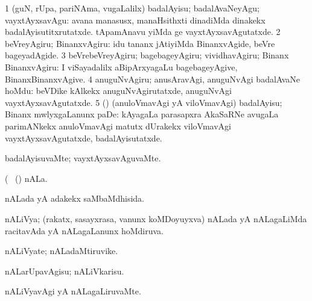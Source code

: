 \noindent
\gl{\akirx}
\expl{}
\bmng
\bnum
\num{1} (guN, rUpa, pariNAma, \mo vugaLalilx) badalAyisu; badalAvaNeyAgu; vayxtAyxsavAgu:  avana manasusx, manaHsithxti dinadiMda dinakekx badalAyisutitxrutatxde.     tApamAnavu  yiMda  ge vayxtAyxsavAgutatxde. 
\num{2} beVreyAgiru; BinanxvAgiru:  idu tananx jAtiyiMda BinanxvAgide, beVre bageyadAgide. 
\num{3} beVrebeVreyAgiru; bagebageyAgiru; vividhavAgiru; Binanx BinanxvAgiru:  I viSayadalilx aBipArxyagaLu bagebageyAgive, BinanxBinanxvAgive. 
\num{4} anuguNvAgiru; anusAravAgi, anuguNvAgi badalAvaNe hoMdu:  beVDike kAlkekx anuguNvAgirutatxde, anuguNvAgi vayxtAyxsavAgutatxde. 
\num{5} (\ga) (anuloVmavAgi yA viloVmavAgi) badalAyisu; Binanx mwlyxgaLanunx paDe:  kAyagaLa parasapxra AkaSaRNe avugaLa parimANkekx anuloVmavAgi matutx dUrakekx viloVmavAgi vayxtAyxsavAgutatxde, badalAyisutatxde. 
\enum
\emng
\eentry

\bentry
{} 
\gl{\kirxvi}
\expl{}
\bmng
 badalAyisuvaMte; vayxtAyxsavAguvaMte. 
\emng
\eentry

\bentry
{} 
\gl{\nA}(\bava\ 
\bmng
(\aMrashA) nALa. 
\emng
\eentry

\bentry
{} 
\gl{\gu}
\expl{}
\bmng
nALada yA adakekx saMbaMdhisida. 
\emng
\eentry

\bentry
{} 
\gl{\gu}
\expl{}
\bmng
 nALiVya; (rakatx, sasayxrasa, \mo vanunx koMDoyuyxva) nALada yA nALagaLiMda racitavAda yA nALagaLanunx hoMdiruva. 
\emng
\eentry

\bentry
{} 
\gl{\sakirx}
\expl{}
\bmng
\emng
\eentry

\bentry
{} 
\gl{\nA}
\expl{}
\bmng
 nALiVyate; nALadaMtiruvike. 
\emng
\eentry

\bentry
{} 
\gl{\sakirx}
\expl{}
\bmng
 nALarUpavAgisu; nALiVkarisu. 
\emng
\eentry

\bentry
{} 
\gl{\kirxvi}
\expl{}
\bmng
 nALiVyavAgi yA nALagaLiruvaMte. 
\emng
\eentry

